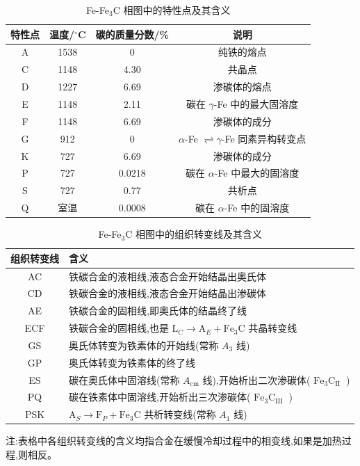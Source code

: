 \documentclass[UTF8]{ctexbook}
\newcommand{\◎}{\ensuremath{\bigcirc}}
\begin{document}
\begin{table}[H]
\centering
\caption{Fe-Fe$_3$C 相图中的特性点及其含义}
\label{tab:2-1}
\begin{tabular}{|c|c|c|c|}
\hline
特性点 & 温度/$^{\circ}$C & 碳的质量分数/\% & 说明 \\
\hline
A & 1538 & 0 & 纯铁的熔点 \\
\hline
C & 1148 & 4.30 & 共晶点 \\
\hline
D & 1227 & 6.69 & 渗碳体的熔点 \\
\hline
E & 1148 & 2.11 & 碳在 $\gamma$-Fe 中的最大固溶度 \\
\hline
F & 1148 & 6.69 & 渗碳体的成分 \\
\hline
G & 912 & 0 & $\alpha$-Fe $\rightleftharpoons \gamma$-Fe 同素异构转变点 \\
\hline
K & 727 & 6.69 & 渗碳体的成分 \\
\hline
P & 727 & 0.0218 & 碳在 $\alpha$-Fe 中最大的固溶度 \\
\hline
S & 727 & 0.77 & 共析点 \\
\hline
Q & 室温 & 0.0008 & 碳在 $\alpha$-Fe 中的固溶度 \\
\hline
\end{tabular}
\end{table}

\begin{table}[H]
\centering
\caption{Fe-Fe$_3$C 相图中的组织转变线及其含义}
\label{tab:2-2}
\begin{tabular}{|c|p{370pt}|}
\hline
组织转变线 & 含义 \\
\hline
AC & 铁碳合金的液相线,液态合金开始结晶出奥氏体 \\
\hline
CD & 铁碳合金的液相线,液态合金开始结晶出渗碳体 \\
\hline
AE & 铁碳合金的固相线,即奥氏体的结晶终了线 \\
\hline
ECF & 铁碳合金的固相线,也是 $\mathrm{L}_{C} \longrightarrow \mathrm{A}_{E}+\mathrm{Fe}_{3} \mathrm{C}$ 共晶转变线 \\
\hline
GS & 奥氏体转变为铁素体的开始线(常称 $A_{3}$ 线) \\
\hline
GP & 奥氏体转变为铁素体的终了线 \\
\hline
ES & 碳在奥氏体中固溶线(常称 $A_{\mathrm{cm}}$ 线),开始析出二次渗碳体( $\mathrm{Fe}_{3} \mathrm{C}_{\text {II }}$ ) \\
\hline
PQ & 碳在铁素体中固溶线,开始析出三次渗碳体( $\mathrm{Fe}_{3} \mathrm{C}_{\text {III }}$ ) \\
\hline
PSK & $\mathrm{A}_{S} \longrightarrow \mathrm{F}_{P}+\mathrm{Fe}_{3} \mathrm{C}$ 共析转变线(常称 $A_{1}$ 线) \\
\hline
\end{tabular}
\end{table}
注:表格中各组织转变线的含义均指合金在缓慢冷却过程中的相变线,如果是加热过程,则相反。
\end{document}
